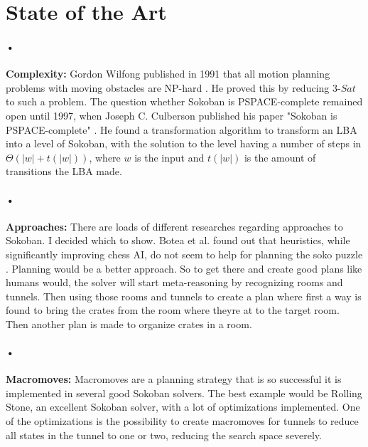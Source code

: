 \documentclass{article}
\begin{document}
\section{State of the Art}
\paragraph*{•}
\textbf{Complexity:} Gordon Wilfong published in 1991 that all motion planning problems with moving obstacles are NP-hard \cite{WilfongNPhard}. He proved this by reducing $3$-$Sat$ to such a problem. The question whether Sokoban is PSPACE-complete remained open until 1997, when Joseph C. Culberson published his paper "Sokoban is PSPACE-complete" \cite{PSpaceComplete}. He found a transformation algorithm to transform an LBA into a level of Sokoban, with the solution to the level having a number of steps in $\Theta (|w|+t(|w|))$, where $w$ is the input and $t(|w|)$ is the amount of transitions the LBA made. %
\paragraph*{•}
\textbf{Approaches:} There are loads of different researches regarding approaches to Sokoban. I decided which to show. Botea et al. found out that heuristics, while significantly improving chess AI, do not seem to help for planning the soko puzzle \cite{BoteaHeuristicsVsPlanning}. Planning would be a better approach. So to get there and create good plans like humans would, the solver will start meta-reasoning by recognizing rooms and tunnels. Then using those rooms and tunnels to create a plan where first a way is found to bring the crates from the room where theyre at to the target room. Then another plan is made to organize crates in a room.
\paragraph*{•}
\textbf{Macromoves:} Macromoves are a planning strategy that is so successful it is implemented in several good Sokoban solvers. The best example would be Rolling Stone, an excellent Sokoban solver, with a lot of optimizations implemented. One of the optimizations is the possibility to create macromoves for tunnels to reduce all states in the tunnel to one or two, reducing the search space severely.
\end{document}
